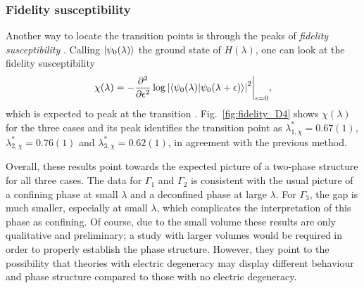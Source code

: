\subsubsection*{Fidelity susceptibility}

Another way to locate the transition points is through the peaks of \emph{fidelity susceptibility} \cite{you2007fidelity, wang2016fidelity}.
Calling $\ket{\psi_0(\lambda)}$ the ground state of $H(\lambda)$, one can look at the fidelity susceptibility
\cite{you2007fidelity}
\begin{equation}
    \chi(\lambda) = -\frac{\partial^2}{\partial \epsilon^2} \log \abs{\expval{\psi_0(\lambda) | \psi_0(\lambda+\epsilon) }}^2 \bigg\lvert_{\epsilon=0},
\end{equation}
which is expected to peak at the transition \cite{wang2016fidelity}.
Fig.~\ref{fig:fidelity_D4} shows $\chi(\lambda)$ for the three cases and its peak identifies the transition point as $\lambda_{1, \chi}^*=0.67(1)$, $\lambda_{2, \chi}^*=0.76(1)$ and $\lambda_{3, \chi}^*=0.62(1)$, in agreement with the previous method.

\bigbreak

Overall, these results point towards the expected picture of a two-phase structure for all three cases.
The data for $\Gamma_1$ and $\Gamma_2$ is consistent with the usual picture of a confining phase at small $\lambda$ and a deconfined phase at large $\lambda$.
For $\Gamma_3$, the gap is much smaller, especially at small $\lambda$, which complicates the interpretation of this phase as confining.
Of course, due to the small volume these results are only qualitative and preliminary; a study with larger volumes would be required in order to properly establish the phase structure.
However, they point to the possibility that theories with electric degeneracy may display different behaviour and phase structure compared to those with no electric degeneracy.

\newpage

\vspace*{1cm}

